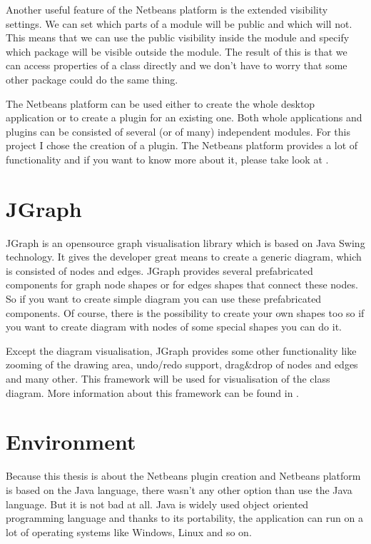Another useful feature of the Netbeans platform is the extended visibility settings. We can set which parts of a module will be public and which will not. This means that we can use the public visibility inside the module and specify which package will be visible outside the module. The result of this is that we can access properties of a class directly and we don't have to worry that some other package could do the same thing.

The Netbeans platform can be used either to create the whole desktop application or to create a plugin for an existing one. Both whole applications and plugins can be consisted of several (or of many) independent modules. For this project I chose the creation of a plugin. The Netbeans platform provides a lot of functionality and if you want to know more about it, please take look at \cite{netbeans6.9DevGuide}.

\section{JGraph}
\label{section:JGraph}

JGraph is an opensource graph visualisation library which is based on Java Swing technology. It gives the developer great means to create a generic diagram, which is consisted of nodes and edges. JGraph provides several prefabricated components for graph node shapes or for edges shapes that connect these nodes. So if you want to create simple diagram you can use these prefabricated components. Of course, there is the possibility to create your own shapes too so if you want to create diagram with nodes of some special shapes you can do it.

Except the diagram visualisation, JGraph provides some other functionality like zooming of the drawing area, undo/redo support, drag\&drop of nodes and edges and many other. This framework will be used for visualisation of the class diagram. More information about this framework can be found in \cite{jgraphmanual}.

\section{Environment}

Because this thesis is about the Netbeans plugin creation and Netbeans platform is based on the Java language, there wasn't any other option than use the Java language. But it is not bad at all. Java is widely used object oriented programming language and thanks to its portability, the application can run on a lot of operating systems like Windows, Linux and so on.


